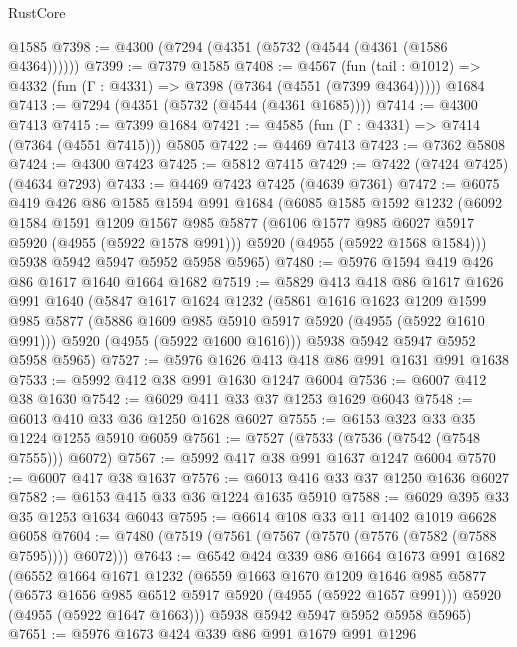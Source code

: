 \begin{lexlean}{RustCore}
\begin{coremodule}
    @1585
@7398 := @4300 (@7294 (@4351 (@5732 (@4544 (@4361 (@1586 @4364))))))
@7399 := @7379 @1585
@7408 := @4567
    (fun (tail : @1012) => @4332 (fun (Γ : @4331) => @7398 (@7364 (@4551 (@7399 @4364)))))
    @1684
@7413 := @7294 (@4351 (@5732 (@4544 (@4361 @1685))))
@7414 := @4300 @7413
@7415 := @7399 @1684
@7421 := @4585 (fun (Γ : @4331) => @7414 (@7364 (@4551 @7415))) @5805
@7422 := @4469 @7413
@7423 := @7362 @5808
@7424 := @4300 @7423
@7425 := @5812 @7415
@7429 := @7422 (@7424 @7425) (@4634 @7293)
@7433 := @4469 @7423 @7425 (@4639 @7361)
@7472 := @6075
    @419
    @426
    @86
    @1585
    @1594
    @991
    @1684
    (@6085
      @1585
      @1592
      @1232
      (@6092
        @1584
        @1591
        @1209
        @1567
        @985
        @5877
        (@6106 @1577 @985 @6027 @5917 @5920 (@4955 (@5922 @1578 @991)))
        @5920
        (@4955 (@5922 @1568 @1584)))
      @5938
      @5942
      @5947
      @5952
      @5958
      @5965)
@7480 := @5976 @1594 @419 @426 @86 @1617 @1640 @1664 @1682
@7519 := @5829
    @413
    @418
    @86
    @1617
    @1626
    @991
    @1640
    (@5847
      @1617
      @1624
      @1232
      (@5861
        @1616
        @1623
        @1209
        @1599
        @985
        @5877
        (@5886 @1609 @985 @5910 @5917 @5920 (@4955 (@5922 @1610 @991)))
        @5920
        (@4955 (@5922 @1600 @1616)))
      @5938
      @5942
      @5947
      @5952
      @5958
      @5965)
@7527 := @5976 @1626 @413 @418 @86 @991 @1631 @991 @1638
@7533 := @5992 @412 @38 @991 @1630 @1247 @6004
@7536 := @6007 @412 @38 @1630
@7542 := @6029 @411 @33 @37 @1253 @1629 @6043
@7548 := @6013 @410 @33 @36 @1250 @1628 @6027
@7555 := @6153 @323 @33 @35 @1224 @1255 @5910 @6059
@7561 := @7527 (@7533 (@7536 (@7542 (@7548 @7555))) @6072)
@7567 := @5992 @417 @38 @991 @1637 @1247 @6004
@7570 := @6007 @417 @38 @1637
@7576 := @6013 @416 @33 @37 @1250 @1636 @6027
@7582 := @6153 @415 @33 @36 @1224 @1635 @5910
@7588 := @6029 @395 @33 @35 @1253 @1634 @6043
@7595 := @6614 @108 @33 @11 @1402 @1019 @6628 @6058
@7604 := @7480 (@7519 (@7561 (@7567 (@7570 (@7576 (@7582 (@7588 @7595)))) @6072)))
@7643 := @6542
    @424
    @339
    @86
    @1664
    @1673
    @991
    @1682
    (@6552
      @1664
      @1671
      @1232
      (@6559
        @1663
        @1670
        @1209
        @1646
        @985
        @5877
        (@6573 @1656 @985 @6512 @5917 @5920 (@4955 (@5922 @1657 @991)))
        @5920
        (@4955 (@5922 @1647 @1663)))
      @5938
      @5942
      @5947
      @5952
      @5958
      @5965)
@7651 := @5976 @1673 @424 @339 @86 @991 @1679 @991 @1296

\end{coremodule}
\end{lexlean}
